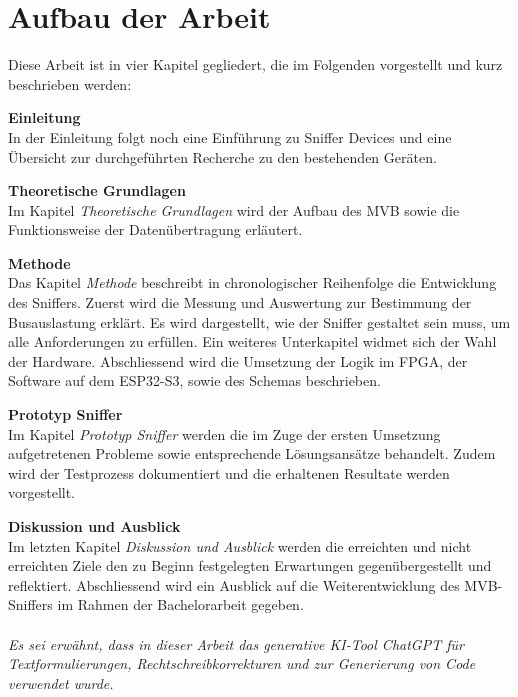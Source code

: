 
\section{Aufbau der Arbeit}
\label{Aufbau der Arbeit} %
Diese Arbeit ist in vier Kapitel gegliedert, die im Folgenden vorgestellt und kurz beschrieben werden:

\textbf{Einleitung}\\
In der Einleitung folgt noch eine Einführung zu Sniffer Devices und eine Übersicht zur durchgeführten Recherche zu den bestehenden Geräten.

\textbf{Theoretische Grundlagen}\\
Im Kapitel \textit{Theoretische Grundlagen} wird der Aufbau des MVB sowie die Funktionsweise der Datenübertragung erläutert.

\textbf{Methode}\\
Das Kapitel \textit{Methode} beschreibt in chronologischer Reihenfolge die Entwicklung des Sniffers. Zuerst wird die Messung und Auswertung zur Bestimmung der Busauslastung erklärt. Es wird dargestellt, wie der Sniffer gestaltet sein muss, um alle Anforderungen zu erfüllen. Ein weiteres Unterkapitel widmet sich der Wahl der Hardware. Abschliessend wird die Umsetzung der Logik im FPGA, der Software auf dem ESP32-S3, sowie des Schemas beschrieben.

\textbf{Prototyp Sniffer}\\
Im Kapitel \textit{Prototyp Sniffer} werden die im Zuge der ersten Umsetzung aufgetretenen Probleme sowie entsprechende Lösungsansätze behandelt. Zudem wird der Testprozess dokumentiert und die erhaltenen Resultate werden vorgestellt.

\textbf{Diskussion und Ausblick}\\
Im letzten Kapitel \textit{Diskussion und Ausblick} werden die erreichten und nicht erreichten Ziele den zu Beginn festgelegten Erwartungen gegenübergestellt und reflektiert. Abschliessend wird ein Ausblick auf die Weiterentwicklung des MVB-Sniffers im Rahmen der Bachelorarbeit gegeben.\\
\\
\textit{Es sei erwähnt, dass in dieser Arbeit das generative KI-Tool ChatGPT für Textformulierungen, Rechtschreibkorrekturen und zur Generierung von Code verwendet wurde.}